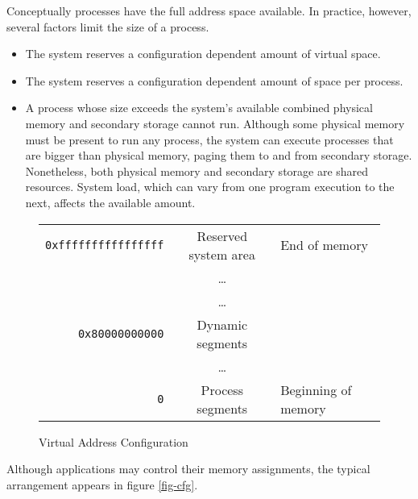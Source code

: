 Conceptually processes have the full address space available.
In practice, however, several factors limit the size of a process.
\begin{itemize}
  \item The system reserves a configuration dependent amount of virtual space.
  \item The system reserves a configuration dependent amount of space per
    process.
  \item
    A process whose size exceeds the system's available combined physical
    memory and secondary storage cannot run. Although some physical memory
    must be present to run any process, the system can execute processes that
    are bigger than physical memory, paging them to and from secondary storage.
    Nonetheless, both physical memory and secondary storage are
    shared resources. System load, which can vary from one program execution
    to the next, affects the available amount.
\end{itemize}

\begin{figure}[H]
\Hrule
  \caption{Virtual Address Configuration}
  \label{fig-address}
  \begin{center}
    \begin{tabular}{r|c|l}
      \noalign{\smallskip}  \cline{2-2}
      \verb|0xffffffffffffffff| & Reserved system area & End of memory\\ 
      & \dots & \\ \cline{2-2}
      & \dots & \\
      \verb|0x80000000000| & Dynamic segments & \\ \cline{2-2}
      & \dots & \\
      \verb|0| & Process segments & Beginning of memory\\ \cline{2-2}
    \end{tabular}
  \end{center}
\Hrule
\end{figure}

Although applications may control their memory assignments, the typical
arrangement appears in figure \ref{fig-cfg}.

